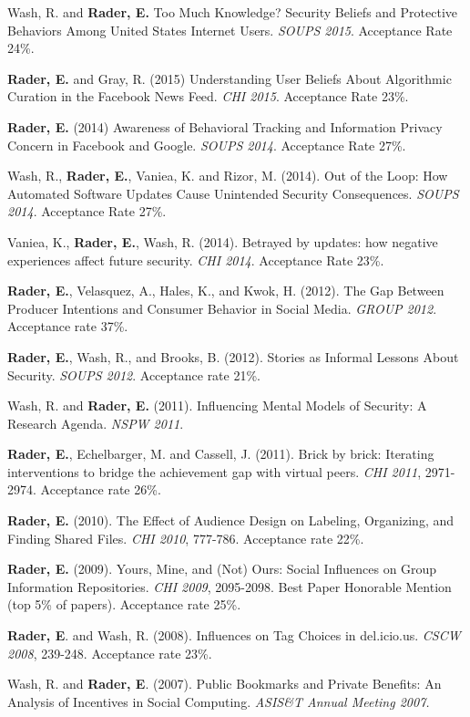 \documentclass[9pt]{extarticle}
\begin{document}
Wash, R. and \textbf{Rader, E.} Too Much Knowledge? Security Beliefs and Protective Behaviors Among United States Internet Users. \emph{SOUPS 2015}. Acceptance Rate 24\%.

\textbf{Rader, E.} and Gray, R. (2015) Understanding User Beliefs About Algorithmic Curation in the Facebook News Feed. \emph{CHI 2015}. Acceptance Rate 23\%.

\textbf{Rader, E.} (2014) Awareness of Behavioral Tracking and Information Privacy Concern in Facebook and Google. \emph{SOUPS 2014}. Acceptance Rate 27\%.

Wash, R., \textbf{Rader, E.}, Vaniea, K. and Rizor, M. (2014). Out of the Loop: How Automated Software Updates Cause Unintended Security Consequences. \emph{SOUPS 2014}. Acceptance Rate 27\%.

Vaniea, K., \textbf{Rader, E.}, Wash, R. (2014). Betrayed by updates: how negative experiences affect future security. \emph{CHI 2014}. Acceptance Rate 23\%.

\textbf{Rader, E.}, Velasquez, A., Hales, K., and Kwok, H. (2012). The Gap Between Producer Intentions and Consumer Behavior in Social Media. \emph{GROUP 2012}. Acceptance rate 37\%.

\textbf{Rader, E.}, Wash, R., and Brooks, B. (2012). Stories as Informal Lessons About Security. \emph{SOUPS 2012}. Acceptance rate 21\%.

Wash, R. and \textbf{Rader, E.} (2011). Influencing Mental Models of Security: A Research Agenda. \emph{NSPW 2011}.

\textbf{Rader, E.}, Echelbarger, M. and Cassell, J. (2011). Brick by brick: Iterating interventions to bridge the achievement gap with virtual peers. \emph{CHI 2011}, 2971-2974. Acceptance rate 26\%.

\textbf{Rader, E.} (2010). The Effect of Audience Design on Labeling, Organizing, and Finding Shared Files. \emph{CHI 2010}, 777-786. Acceptance rate 22\%.

\textbf{Rader, E.} (2009). Yours, Mine, and (Not) Ours: Social Influences on Group Information Repositories. \emph{CHI 2009}, 2095-2098. Best Paper Honorable Mention (top 5\% of papers). Acceptance rate 25\%.

\textbf{Rader, E}. and Wash, R. (2008). Influences on Tag Choices in del.icio.us. \emph{CSCW 2008}, 239-248. Acceptance rate 23\%.

Wash, R. and \textbf{Rader, E}. (2007). Public Bookmarks and Private Benefits: An Analysis of Incentives in Social Computing. \emph{ASIS\&T Annual Meeting 2007.}
\end{document}
